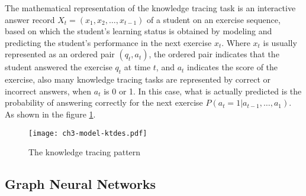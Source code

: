 The mathematical representation of the knowledge tracing task is an interactive answer record \(X_t=(x_1,x_2,\ldots,x_{t-1})\) of a student on an exercise sequence, based on which the student's learning status is obtained by modeling and predicting the student's performance in the next exercise \(x_{t}\). Where \(x_t\) is usually represented as an ordered pair \((q_t,a_t)\), the ordered pair indicates that the student answered the exercise \(q_t\) at time \(t\), and \(a_t\) indicates the score of the exercise, also many knowledge tracing tasks are represented by correct or incorrect answers, when \(a_t\) is 0 or 1. In this case, what is actually predicted is the probability of answering correctly for the next exercise \(P(a_{t}=1|a_{t-1},\ldots,a_1)\). As shown in the figure \figurename{\ref{fig:ch3-model-ktdes}}.

\begin{figure}
	\texttt{[image: ch3-model-ktdes.pdf]}
	\caption{The knowledge tracing pattern}\label{fig:ch3-model-ktdes}
\end{figure}

\subsection{Graph Neural Networks}

